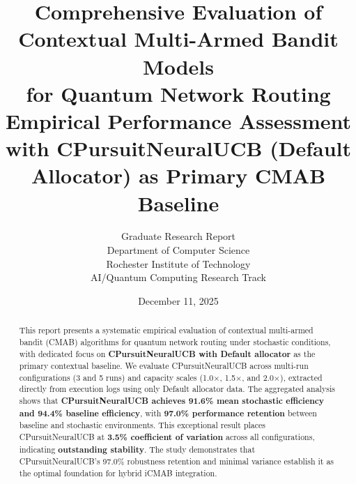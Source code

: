 \documentclass[12pt,a4paper]{article}
\title{\textbf{Comprehensive Evaluation of Contextual Multi-Armed Bandit Models\\for Quantum Network Routing}\\
\large{Empirical Performance Assessment with CPursuitNeuralUCB (Default Allocator) as Primary CMAB Baseline}}
\author{Graduate Research Report\\
Department of Computer Science\\
Rochester Institute of Technology\\
AI/Quantum Computing Research Track}
\date{December 11, 2025}
\newcommand{\primarytext}[1]{\textcolor{primaryblue}{\textbf{#1}}}
\newcommand{\success}[1]{\textcolor{accentgreen}{\textbf{#1}}}
\begin{document}
\maketitle

\begin{abstract}
This report presents a systematic empirical evaluation of contextual multi-armed bandit (CMAB) algorithms for quantum network routing under stochastic conditions, with dedicated focus on \primarytext{CPursuitNeuralUCB with Default allocator} as the primary contextual baseline. We evaluate CPursuitNeuralUCB across multi-run configurations (3 and 5 runs) and capacity scales (1.0$\times$, 1.5$\times$, and 2.0$\times$), extracted directly from execution logs using only Default allocator data. The aggregated analysis shows that \primarytext{CPursuitNeuralUCB achieves 91.6\% mean stochastic efficiency and 94.4\% baseline efficiency}, with \success{97.0\% performance retention} between baseline and stochastic environments. This exceptional result places CPursuitNeuralUCB at \primarytext{3.5\% coefficient of variation} across all configurations, indicating \success{outstanding stability}. The study demonstrates that CPursuitNeuralUCB's 97.0\% robustness retention and minimal variance establish it as the optimal foundation for hybrid iCMAB integration.
\end{abstract}

\newpage
\vspace{0.5cm}
\tableofcontents

\newpage
\end{document}
